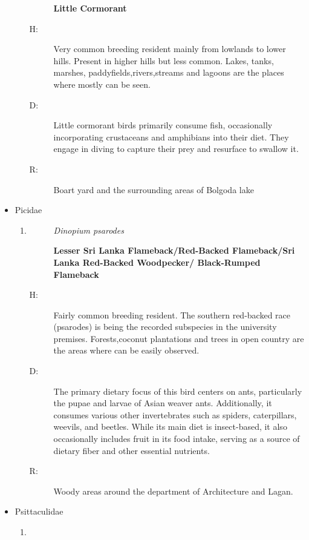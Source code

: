 \begin{itemize}
\begin{enumerate}
\begin{description}
\item[]%
\textbf{Little Cormorant}%
\end{description}%
\begin{description}%
\item[H: ]%
Very common breeding resident mainly from lowlands to lower hills. Present in higher hills but less common. Lakes, tanks, marshes, paddyfields,rivers,streams and lagoons are the places where mostly can be seen.%
\item[D: ]%
Little cormorant birds primarily consume fish, occasionally incorporating crustaceans and amphibians into their diet. They engage in diving to capture their prey and resurface to swallow it.%
\item[R: ]%
Boart yard and the surrounding areas of Bolgoda lake%
\end{description}%
\end{enumerate}%
\item%
Picidae%
\begin{enumerate}%
\item%
\begin{description}%
\item[]%
\textit{Dinopium psarodes}%
\item[]%
\textbf{Lesser Sri Lanka Flameback/Red{-}Backed Flameback/Sri Lanka Red{-}Backed Woodpecker/ Black{-}Rumped Flameback}%
\end{description}%
\begin{description}%
\item[H: ]%
Fairly common breeding resident. The southern red{-}backed race (psarodes) is being the recorded subspecies in the university premises. Forests,coconut plantations and trees in open country are the areas where can be easily observed.%
\item[D: ]%
The primary dietary focus of this bird centers on ants, particularly the pupae and larvae of Asian weaver ants. Additionally, it consumes various other invertebrates such as spiders, caterpillars, weevils, and beetles. While its main diet is insect{-}based, it also occasionally includes fruit in its food intake, serving as a source of dietary fiber and other essential nutrients.%
\item[R: ]%
Woody areas around the department of Architecture and Lagan.%
\end{description}%
\end{enumerate}%
\item%
Psittaculidae%
\begin{enumerate}%
\item%

\end{enumerate}
\end{itemize}
